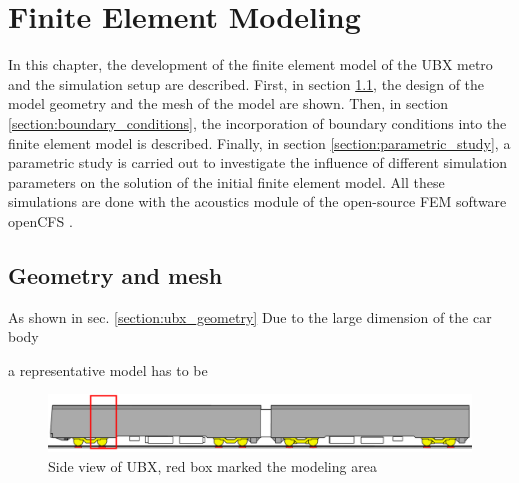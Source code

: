 \chapter{Finite Element Modeling}
\label{chap:FEM}

In this chapter, the development of the finite element model of the UBX metro and the simulation setup are described. First, in section \ref{section:geometry}, the design of the model geometry and the mesh of the model are shown. Then, in section \ref{section:boundary_conditions}, the incorporation of boundary conditions into the finite element model is described. Finally, in section \ref{section:parametric_study}, a parametric study is carried out to investigate the influence of different simulation parameters on the solution of the initial finite element model. All these simulations are done with the acoustics module of the open-source FEM software openCFS \cite{opencfs}.


\section{Geometry and mesh}
\label{section:geometry}

As shown in sec. \ref{section:ubx_geometry}
Due to the large dimension of the car body 

a representative model has to be

\begin{figure}[H]
	\centering
	\includegraphics[width=\textwidth]{fig/chap4/geometry/model_area.png}
	\caption{Side view of UBX, red box marked the modeling area}
\end{figure}

